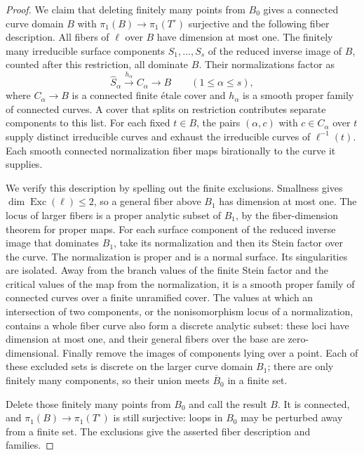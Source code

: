 \documentclass[11pt]{amsart}
\theoremstyle{definition}
\theoremstyle{remark}
\numberwithin{equation}{section}
\DeclareMathOperator{\Exc}{Exc}
\begin{document}
\begin{proof}
We claim that deleting finitely many points from \(B_0\) gives a
connected curve domain \(B\) with
\(\pi_1(B)\to\pi_1(T^\circ)\) surjective and the following fiber
description.  All fibers of \(\ell\) over \(B\) have dimension at
most one.  The finitely many irreducible surface components
\(S_1,\ldots,S_s\) of the reduced inverse image of \(B\), counted
after this restriction, all dominate \(B\).  Their normalizations
factor as
\[
 \widehat S_\alpha\xrightarrow{\,h_\alpha\,}C_\alpha
 \longrightarrow B \qquad (1\le\alpha\le s),
\]
where \(C_\alpha\to B\) is a connected finite \'etale cover and
\(h_\alpha\) is a smooth proper family of connected curves.  A cover
that splits on restriction contributes separate components to this
list.  For each fixed \(t\in B\), the pairs \((\alpha,c)\) with
\(c\in C_\alpha\) over \(t\) supply distinct irreducible curves and
exhaust the irreducible curves of \(\ell^{-1}(t)\).  Each smooth
connected normalization fiber maps birationally to the curve it
supplies.

We verify this description by spelling out the finite exclusions.
Smallness gives \(\dim\Exc(\ell)\le2\), so a general fiber above
\(B_1\) has dimension at most one.  The locus of larger fibers is a
proper analytic subset of \(B_1\), by the fiber-dimension theorem
for proper maps.  For each surface component of the reduced inverse
image that dominates \(B_1\), take its normalization and then its Stein factor over the
curve.  The normalization is proper and is a normal surface.
Its singularities are isolated.  Away from the branch values of the
finite Stein factor and the critical values of the map from the
normalization, it is a smooth proper family of connected curves
over a finite unramified cover.  The values at which an intersection
of two components, or the nonisomorphism locus of a normalization,
contains a whole fiber curve also form a discrete analytic subset:
these loci have dimension at most one, and their general fibers
over the base are zero-dimensional.  Finally remove the images of
components lying over a point.  Each of these excluded sets is
discrete on the larger curve domain \(B_1\); there are only finitely
many components, so their union meets \(\overline B_0\) in a finite
set.

Delete those finitely many points from \(B_0\) and call the result
\(B\).  It is connected, and
\(\pi_1(B)\to\pi_1(T^\circ)\) is still surjective: loops in \(B_0\)
may be perturbed away from a finite set.  The exclusions give the
asserted fiber description and families.


\end{proof}
\end{document}
